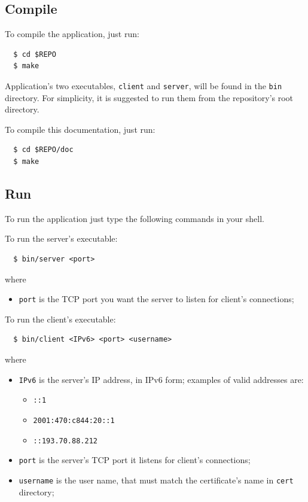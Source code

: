 \documentclass[a4paper,12pt]{article}
\begin{document}
\subsection{Compile}
To compile the application, just run:
\begin{verbatim}
  $ cd $REPO
  $ make
\end{verbatim}

Application's two executables, \texttt{client} and \texttt{server}, will be found in the \texttt{bin} directory.
For simplicity, it is suggested to run them from the repository's root directory.

To compile this documentation, just run:
\begin{verbatim}
  $ cd $REPO/doc
  $ make
\end{verbatim}

\subsection{Run}
To run the application just type the following commands in your shell.

To run the server's executable:
\begin{verbatim}
  $ bin/server <port>
\end{verbatim}
where
\begin{itemize}
  \item \texttt{port} is the TCP port you want the server to listen for client's connections;
\end{itemize}

To run the client's executable:
\begin{verbatim}
  $ bin/client <IPv6> <port> <username>
\end{verbatim}
where
\begin{itemize}
  \item \texttt{IPv6} is the server's IP address, in IPv6 form; examples of valid addresses are:
  \begin{itemize}
    \item \texttt{::1}
    \item \texttt{2001:470:c844:20::1}
    \item \texttt{::193.70.88.212}
  \end{itemize}
  \item \texttt{port} is the server's TCP port it listens for client's connections;
  \item \texttt{username} is the user name, that must match the certificate's name in \texttt{cert} directory;
\end{itemize}
\end{document}
